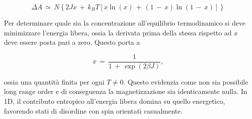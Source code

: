 \begin{equation}
    \Delta A\,\simeq\,N\left\{2Jx\,+\,k_B T \left[x\ln{\left(x\right)}\,+\,\left(1\,-\,x\right)\ln{\left(1\,-\,x\right)}\right]\right\}
    \label{eq: freeE_dw1_Ising1D}
\end{equation}

Per determinare quale sia la concentrazione all'equilibrio termodinamico si deve minimizzare l'energia libera, ossia la derivata prima 
della stessa rispetto ad $x$ deve essere posta pari a zero. Questo porta a 

\begin{equation}
    x\,=\,\frac{1}{1\,+\,\exp{\left(2 \beta J\right)}}, 
    \label{eq: con_dw_Ising1D}
\end{equation}

ossia una quantità finita per ogni $T \neq 0$. Questo evidenzia come non sia possibile long range order e 
di conseguenza la magnetizzazione sia identicamente nulla. In 1D, il contributo entropico all'energia libera domina su quello energetico, 
favorendo stati di disordine con spin orientati casualmente.
